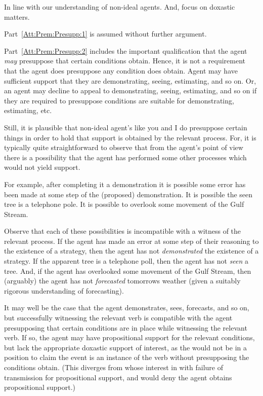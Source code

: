 \documentclass[10pt]{article}
\begin{document}
\begin{note}
  In line with our understanding of non-ideal agents.
  And, focus on doxastic matters.

  Part~\ref{Att:Prem:Presupp:1} is assumed without further argument.

  Part~\ref{Att:Prem:Presupp:2} includes the important qualification that the agent \emph{may} presuppose that certain conditions obtain.
  Hence, it is not a requirement that the agent does presuppose any condition does obtain.
  Agent may have sufficient support that they are demonstrating, seeing, estimating, and so on.
  Or, an agent may decline to appeal to demonstrating, seeing, estimating, and so on if they are required to presuppose conditions are suitable for demonstrating, estimating, etc.

  Still, it is plausible that non-ideal agent's like you and I do presuppose certain things in order to hold that support is obtained by the relevant process.
  For, it is typically quite straightforward to observe that from the agent's point of view there is a possibility that the agent has performed some other processes which would not yield support.

  For example, after completing it a demonstration it is possible some error has been made at some step of the (proposed) demonstration.
  It is possible the seen tree is a telephone pole.
  It is possible to overlook some movement of the Gulf Stream.

  Observe that each of these possibilities is incompatible with a witness of the relevant process.
  If the agent has made an error at some step of their reasoning to the existence of a strategy, then the agent has not \emph{demonstrated} the existence of a strategy.
  If the apparent tree is a telephone poll, then the agent has not \emph{seen} a tree.
  And, if the agent has overlooked some movement of the Gulf Stream, then (arguably) the agent has not \emph{forecasted} tomorrows weather (given a suitably rigorous understanding of forecasting).

  It may well be the case that the agent demonstrates, sees, forecasts, and so on, but successfully witnessing the relevant verb is compatible with the agent presupposing that certain conditions are in place while witnessing the relevant verb.
  If so, the agent may have propositional support for the relevant conditions, but lack the appropriate doxastic support of interest, as the would not be in a position to claim the event is an instance of the verb without presupposing the conditions obtain.
  (This diverges from \citeauthor{Wright:2016wl} whose interest in with failure of transmission for propositional support, and would deny the agent obtains propositional support.)


\end{note}
\end{document}
